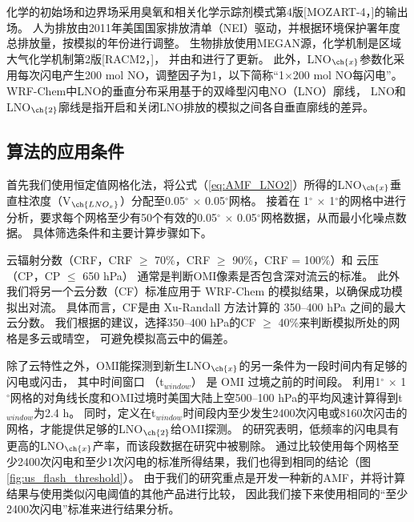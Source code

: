 化学的初始场和边界场采用臭氧和相关化学示踪剂模式第4版[MOZART-4，\citet{Emmons.2010}]的输出场。
人为排放由2011年美国国家排放清单（NEI）驱动，并根据环境保护署年度总排放量，按模拟的年份进行调整\citep{EPA.2015}。
生物排放使用MEGAN源，化学机制是区域大气化学机制第2版[RACM2，\citet{Goliff.2013}]，
并由\citet{Browne.2014}和\citet{Schwantes.2015}进行了更新。
此外，LNO$_{\ch{x}}$参数化采用每次闪电产生200 mol NO，调整因子为1，以下简称“1$\times$200 mol NO每闪电”。
WRF-Chem中LNO的垂直分布采用基于\citet{Ott.2010}的双峰型闪电NO（LNO）廓线\citep{Laughner.2017}，
LNO和LNO$_{\ch{2}}$廓线是指开启和关闭LNO排放的模拟之间各自垂直廓线的差异。


\subsection{算法的应用条件}

首先我们使用恒定值网格化法，将公式（\ref{eq:AMF_LNO2}）所得的LNO$_{\ch{x}}$垂直柱浓度（V$_{\ch{LNO_x}}$）分配至0.05$^{\circ}$ $\times$ 0.05$^{\circ}$网格\citep{Kuhlmann.2014}。
接着在 1$^{\circ}$ $\times$ 1$^{\circ}$的网格中进行分析，要求每个网格至少有50个有效的0.05$^{\circ}$ $\times$ 0.05$^{\circ}$网格数据，从而最小化噪点数据。
具体筛选条件和主要计算步骤如下。

云辐射分数（CRF，CRF $\geq$ 70\%，CRF $\geq$ 90\%，CRF = 100\%）和 云压（CP，CP $\leq$ 650 hPa）
通常是判断OMI像素是否包含深对流云的标准\citep{Ziemke.2009,Choi.2014,Pickering.2016}。
此外我们将另一个云分数（CF）标准应用于 WRF-Chem 的模拟结果，以确保成功模拟出对流。
具体而言，CF是由 Xu-Randall 方法计算的 350--400 hPa 之间的最大云分数\citep{Xu.1996,Strode.2017}。
我们根据\citet{Strode.2017}的建议，选择350--400 hPa的CF $\geq$ 40\%来判断模拟所处的网格是多云或晴空，
可避免模拟高云中的偏差。

除了云特性之外，OMI能探测到新生LNO$_{\ch{x}}$的另一条件为一段时间内有足够的闪电或闪击，
其中时间窗口 （t$_{window}$） 是 OMI 过境之前的时间段。
\citet{Lapierre.2020}利用1$^{\circ}$ $\times$ 1$^{\circ}$网格的对角线长度和OMI过境时美国大陆上空500--100 hPa的平均风速计算得到t$_{window}$为2.4 h。
同时，\citet{Lapierre.2020}定义在t$_{window}$时间段内至少发生2400次闪电或8160次闪击的网格，才能提供足够的LNO$_{\ch{2}}$给OMI探测。
\citet{Bucsela.2019}的研究表明，低频率的闪电具有更高的LNO$_{\ch{x}}$产率，而该段数据在\citet{Lapierre.2020}研究中被剔除。
通过比较使用每个网格至少2400次闪电和至少1次闪电的标准所得结果，我们也得到相同的结论（图\ref{fig:us_flash_threshold}）。
由于我们的研究重点是开发一种新的AMF，并将计算结果与使用类似闪电阈值的其他产品进行比较\citep{Pickering.2016,Lapierre.2020}，
因此我们接下来使用相同的“至少2400次闪电”标准来进行结果分析。


